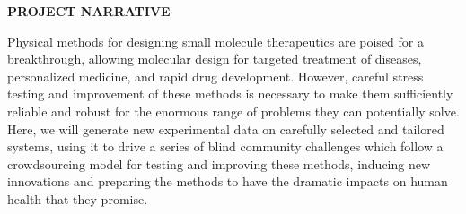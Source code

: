 \documentclass[11pt]{article}
\begin{document}


\begin{centering}
{\bf PROJECT NARRATIVE}

\end{centering}

Physical methods for designing small molecule therapeutics are poised for a breakthrough, allowing molecular design for targeted treatment of diseases, personalized medicine, and rapid drug development. 
However, careful stress testing and improvement of these methods is necessary to make them sufficiently reliable and robust for the enormous range of problems they can potentially solve. 
Here, we will generate new experimental data on carefully selected and tailored systems, using it to drive a series of blind community challenges which follow a crowdsourcing model for testing and improving these methods, inducing new innovations and preparing the methods to have the dramatic impacts on human health that they promise. 



%
%
%
%
\end{document}
